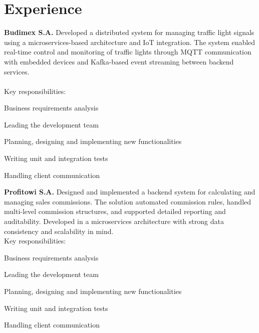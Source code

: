\documentclass[]{plushcv}
\begin{document}
\begin{minipage}[t]{0.70\textwidth}
\section{Experience}
\vspace{\topsep} %
\textbf{Budimex S.A.} 
\justify
Developed a distributed system for managing traffic light signals using a microservices-based architecture and IoT integration. The system enabled real-time control and monitoring of traffic lights through MQTT communication with embedded devices and Kafka-based event streaming between backend services.\\
\\
Key responsibilities:
\begin{tightemize}
    \item Business requirements analysis
    \item Leading the development team
    \item Planning, designing and implementing new functionalities
    \item Writing unit and integration tests
    \item Handling client communication
\end{tightemize}
\sectionsep
\sectionsep
\textbf{Profitowi S.A.} 
\justify
Designed and implemented a backend system for calculating and managing sales commissions. The solution automated commission rules, handled multi-level commission structures, and supported detailed reporting and auditability. Developed in a microservices architecture with strong data consistency and scalability in mind.
\\
Key responsibilities:
\begin{tightemize}
    \item Business requirements analysis
    \item Leading the development team
    \item Planning, designing and implementing new functionalities
    \item Writing unit and integration tests
    \item Handling client communication
\end{tightemize}
\sectionsep
\sectionsep


\end{minipage}
\end{document}
